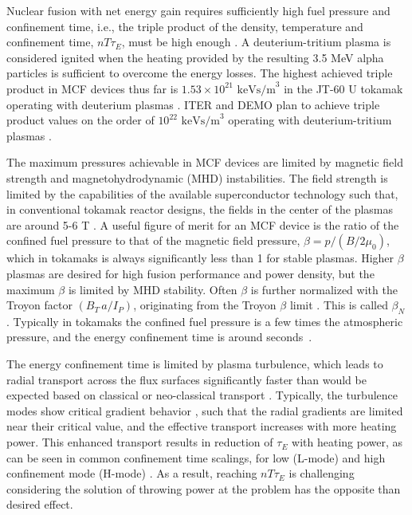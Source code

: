 \documentclass[a4paper, twoside, final, 12pt]{article}
\begin{document}
Nuclear fusion with net energy gain requires sufficiently high fuel pressure and confinement time, i.e., the triple product of the density, temperature and confinement time, $nT\tau_E$,  must be high enough \cite{Lawson_1957}. A deuterium-tritium plasma is considered ignited when the heating provided by the resulting 3.5 MeV alpha particles is sufficient to overcome the energy losses. 
The highest achieved triple product in MCF devices thus far is $1.53\times 10^{21}\text{ keVs/m}^3$ in the JT-60 U tokamak operating with deuterium plasmas \cite{JT60_triple}. ITER and DEMO plan to achieve triple product values on the order of $10^{22}\text{ keVs/m}^3$ operating with deuterium-tritium plasmas \cite{EUROfusionroadmap}.

The maximum pressures achievable in MCF devices are limited by magnetic field strength and magnetohydrodynamic (MHD) instabilities.
The field strength is limited by the capabilities of the available superconductor technology such that, in conventional tokamak reactor designs, the fields in the center of the plasmas are around 5-6 T \cite{zohm_use_2019}. A useful figure of merit for an MCF device is the ratio of the confined fuel pressure to that of the magnetic field pressure, $\beta = p / (B/2\mu_0)$, which in tokamaks is always significantly less than 1 for stable plasmas. Higher $\beta$ plasmas are desired for high fusion performance and power density, but the maximum $\beta$ is limited by MHD stability. Often $\beta$ is further normalized with the Troyon factor $(B_T \, a/ I_P)$, originating from the Troyon $\beta$ limit \cite{Troyon_1988}. This is called $\beta_N$. Typically in tokamaks the confined fuel pressure is a few times the atmospheric pressure, and the energy confinement time is around seconds~\cite{FEDERICI2014882}.


The energy confinement time is limited by plasma turbulence, which leads to radial transport across the flux surfaces significantly faster than would be expected based on classical or neo-classical transport \cite{Ikeda_2007}.
Typically, the turbulence modes show critical gradient behavior \cite{Ikeda_2007}, such that the radial gradients are limited near their critical value, and the effective transport increases with more heating power.
This enhanced transport results in reduction of $\tau_E$ with heating power, as can be seen in common confinement time scalings, for low (L-mode) and high confinement mode (H-mode) \cite{Ikeda_2007}. As a result, reaching $nT\tau_E$ is challenging considering the solution of throwing power at the problem has the opposite than desired effect.
\end{document}
